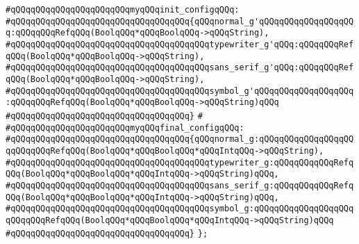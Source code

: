 \verb|#qQQqqQQqqQQqqQQqqQQqqQQqmyqQQqinit_configqQQq:|\newline
\verb|#qQQqqQQqqQQqqQQqqQQqqQQqqQQqqQQqqQQq{qQQqnormal_g'qQQqqQQqqQQqqQQqqQQq:qQQqqQQqRefqQQq(BoolqQQq*qQQqBoolqQQq->qQQqString),|\newline
\verb|#qQQqqQQqqQQqqQQqqQQqqQQqqQQqqQQqqQQqqQQqtypewriter_g'qQQq:qQQqqQQqRefqQQq(BoolqQQq*qQQqBoolqQQq->qQQqString),|\newline
\verb|#qQQqqQQqqQQqqQQqqQQqqQQqqQQqqQQqqQQqqQQqsans_serif_g'qQQq:qQQqqQQqRefqQQq(BoolqQQq*qQQqBoolqQQq->qQQqString),|\newline
\verb|#qQQqqQQqqQQqqQQqqQQqqQQqqQQqqQQqqQQqqQQqsymbol_g'qQQqqQQqqQQqqQQqqQQq:qQQqqQQqRefqQQq(BoolqQQq*qQQqBoolqQQq->qQQqString)qQQq|\newline
\verb|#qQQqqQQqqQQqqQQqqQQqqQQqqQQqqQQqqQQq}|\newline
\verb|#|\newline
\verb|#qQQqqQQqqQQqqQQqqQQqqQQqmyqQQqfinal_configqQQq:|\newline
\verb|#qQQqqQQqqQQqqQQqqQQqqQQqqQQqqQQqqQQq{qQQqnormal_g:qQQqqQQqqQQqqQQqqQQqqQQqqQQqRefqQQq(BoolqQQq*qQQqBoolqQQq*qQQqIntqQQq->qQQqString),|\newline
\verb|#qQQqqQQqqQQqqQQqqQQqqQQqqQQqqQQqqQQqqQQqtypewriter_g:qQQqqQQqqQQqRefqQQq(BoolqQQq*qQQqBoolqQQq*qQQqIntqQQq->qQQqString)qQQq,|\newline
\verb|#qQQqqQQqqQQqqQQqqQQqqQQqqQQqqQQqqQQqqQQqsans_serif_g:qQQqqQQqqQQqRefqQQq(BoolqQQq*qQQqBoolqQQq*qQQqIntqQQq->qQQqString)qQQq,|\newline
\verb|#qQQqqQQqqQQqqQQqqQQqqQQqqQQqqQQqqQQqqQQqsymbol_g:qQQqqQQqqQQqqQQqqQQqqQQqqQQqRefqQQq(BoolqQQq*qQQqBoolqQQq*qQQqIntqQQq->qQQqString)qQQq|\newline
\verb|#qQQqqQQqqQQqqQQqqQQqqQQqqQQqqQQqqQQq}|\newline
\newline
\verb|};|\newline

